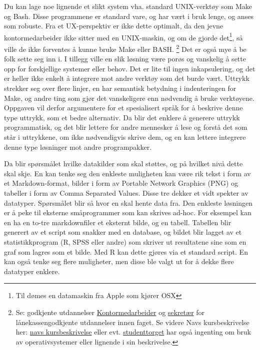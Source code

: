 \documentclass[norsk, 11pt, a4paper]{article}
\begin{document}
Du kan lage noe lignende et slikt system vha. standard UNIX-verktøy som Make og Bash. Disse programmene er standard vare, og har vært i bruk lenge, og anses som robuste. Fra et UX-perspektiv er ikke dette optimalt, da den jevne kontormedarbeider ikke sitter med en UNIX-maskin, og om de gjorde det\footnote{Til dømes en datamaskin fra Apple som kjører OSX}, så ville de ikke forventes å kunne bruke Make eller BASH.
\footnote{Se: godkjente utdannelser \href{https://www.ecademy.no/nettstudier/okonomi-og-administrasjon/kontormedarbeider}{Kontormedarbeider} og \href{http://www.treider.no/kontor-og-administrasjon/sekretaer/}{sekretær} for lånekassengodkjente utdannelser innen faget. Se videre Navs kursbeskrivelse her: \href{https://www.nav.no/Forsiden/\\_attachment/353293?\\_ts=13fc24b8e78}{navs kursbeskrivelse} eller evt. \href{http://www.studenttorget.no/index.php?show=5192&expand=4631,5192&yrkesid=110}{studenttorget} har også ingenting om bruk av operativsystemer eller lignende i sin beskrivelse.}
Det er også mye å be folk sette seg inn i.
I tillegg ville en slik løsning være porøs og vanskelig å sette opp for forskjellige systemer eller behov. Det er lite til ingen inkapsulering, og det er heller ikke enkelt å integrere mot andre verktøy som det burde vært. Uttrykk strekker seg over flere linjer, en har semantisk betydning i indenteringen for Make, og andre ting som gjør det vanskeligere enn nødvendig å bruke verktøyene.
Oppgaven vil derfor argumentere for et spesialisert språk for å beskrive denne type uttrykk, som et bedre alternativ.
Da blir det enklere å generere uttrykk programmatisk, og det blir lettere for andre mennesker å lese og forstå det som står i uttrykkene, om ikke nødvendigvis skrive dem, og en kan lettere integrere denne type løsninger mot andre programpakker.

Da blir spørsmålet hvilke datakilder som skal støttes, og på hvilket nivå dette skal skje. En kan tenke seg den enkleste muligheten kan være rik tekst i form av et Markdown-format, bilder i form av Portable Network Graphics (PNG) og tabeller i form av Comma Separated Values. Disse tre dekker et vidt spekter av datatyper. Spørsmålet blir så hvor en skal hente data fra. Den enkleste løsningen er å peke til eksterne småprogrammer som kan skrives ad-hoc. For eksempel kan en ha en to-tre markdownfiler et eksternt bilde, og en tabell. Tabellen blir generert av et script som snakker med en database, og bildet blir lagget av et statistikkprogram (R, SPSS eller andre) som skriver ut resultatene sine som en graf som lagres som et bilde. Med R kan dette gjøres via et standard script. En kan også tenke seg flere muligheter, men disse ble valgt ut for å dekke flere datatyper enklere.
\end{document}
